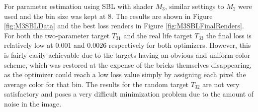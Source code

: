 For parameter estimation using SBL with shader $M_3$, similar settings to $M_2$ were used and the bin size was kept at 8. The results are shown in Figure \ref{fig:M3SBLData} and the best loss renders in Figure \ref{fig:M3SBLFinalRenders}. For both the two-parameter target $T_{31}$ and the real life target $T_{33}$ the final loss is relatively low at $0.001$ and $0.0026$ respectively for both optimizers. However, this is fairly easily achievable due to the targets having an obvious and uniform color scheme, which was restored at the expense of the bricks themselves disappearing, as the optimizer could reach a low loss value simply by assigning each pixel the average color for that bin. The results for the random target $T_{32}$ are not very satisfactory and poses a very difficult minimization problem due to the amount of noise in the image. 

